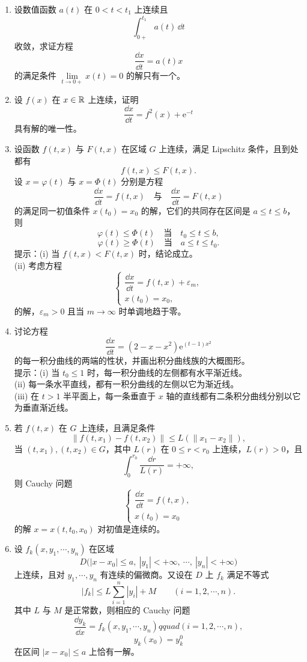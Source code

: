 \begin{enumerate}
\item 设数值函数 $a(t)$ 在 $0<t<t_1$ 上连续且
\[
	\int_{0+}^{t_1} a(t)\,\dd t
\]
收敛，求证方程
\[
	\dfrac{\dd x}{\dd t}=a(t)x
\]
的满足条件 $\lim\limits_{t\to0+}x(t)=0$ 的解只有一个。

\item 设 $f(x)$ 在 $x\in\mathbb{R}$ 上连续，证明
\[
	\dfrac{\dd x}{\dd t}=f^2(x)+\mathrm{e}^{-t}
\]
具有解的唯一性。

\item 设函数 $f(t,x)$ 与 $F(t,x)$ 在区域 $G$ 上连续，满足 Lipschitz 条件，且到处都有
\[
	f(t,x)\leq F(t,x).
\]
设 $x=\varphi(t)$ 与 $x=\Phi(t)$ 分别是方程
\[
	\dfrac{\dd x}{\dd t}=f(t,x)
	\quad\text{与}\quad
	\dfrac{\dd x}{\dd t}=F(t,x)
\]
的满足同一初值条件 $x(t_0)=x_0$ 的解，它们的共同存在区间是 $a\leq t\leq b$，则
\[
	\varphi(t)\leq\Phi(t)\quad\text{当}\quad t_0\leq t\leq b,
\]
\[
	\varphi(t)\geq\Phi(t)\quad\text{当}\quad a\leq t\leq t_0.
\]
提示：\quad(i) 当 $f(t,x)<F(t,x)$ 时，结论成立。\\
\phantom{提示：}\quad(ii) 考虑方程
\[
	\begin{cases}
		\dfrac{\dd x}{\dd t}=f(t,x)+\varepsilon_m,\\
		x(t_0)=x_0,
	\end{cases}
\]
的解，$\varepsilon_m>0$ 且当 $m\to\infty$ 时单调地趋于零。

\item 讨论方程
\[
	\dfrac{\dd x}{\dd t}=(2-x-x^2)\mathrm{e}^{(t-1)x^2}
\]
的每一积分曲线的两端的性状，并画出积分曲线族的大概图形。\\
提示：\quad(i) 当 $t_0\leq1$ 时，每一积分曲线的左侧都有水平渐近线。\\
\phantom{提示：}\quad(ii) 每一条水平直线，都有一积分曲线的左侧以它为渐近线。\\
\phantom{提示：}\quad(iii) 在 $t>1$ 半平面上，每一条垂直于 $x$ 轴的直线都有二条积分曲线分别以它为垂直渐近线。

\item 若 $f(t,x)$ 在 $G$ 上连续，且满足条件
\[
	\|f(t,x_1)-f(t,x_2)\|\leq L(\|x_1-x_2\|),
\]
当 $(t,x_1),(t,x_2)\in G$，其中 $L(r)$ 在 $0\leq r<r_0$ 上连续，$L(r)>0$，且
\[
	\int_0^{r_0}\dfrac{\dd r}{L(r)}=+\infty,
\]
则 Cauchy 问题
\[
	\begin{cases}
		\dfrac{\dd x}{\dd t}=f(t,x),\\
		x(t_0)=x_0
	\end{cases}
\]
的解 $x=x(t,t_0,x_0)$ 对初值是连续的。

\item 设 $f_k(x,y_1,\cdots,y_n)$ 在区域
\[
	D\bigl(|x-x_0|\leq a,\ |y_1|<+\infty,\ \cdots,\ |y_n|<+\infty\bigr)
\]
上连续，且对 $y_1,\cdots,y_n$ 有连续的偏微商。又设在 $D$ 上 $f_k$ 满足不等式
\[
	|f_k|\leq L\sum_{i=1}^n|y_i|+M\qquad(i=1,2,\cdots,n).
\]
其中 $L$ 与 $M$ 是正常数，则相应的 Cauchy 问题
\[
	\dfrac{\dd y_k}{\dd x}=f_k(x,y_1,\cdots,y_n)qquad(i=1,2,\cdots,n),
\]
\[
	y_k(x_0)=y_k^0
\]
在区间 $|x-x_0|\leq a$ 上恰有一解。


\end{enumerate}
